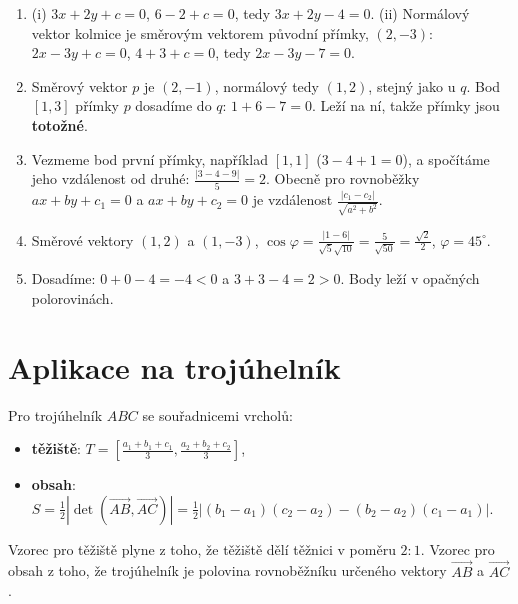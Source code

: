 \begin{solution}
  \begin{enumerate}[label=(\alph*)]
    \item (i) $3x + 2y + c = 0$, $6 - 2 + c = 0$, tedy $3x + 2y - 4 = 0$. (ii) Normálový vektor kolmice je směrovým vektorem původní přímky, $(2, -3)$: $2x - 3y + c = 0$, $4 + 3 + c = 0$, tedy $2x - 3y - 7 = 0$.
    \item Směrový vektor $p$ je $(2, -1)$, normálový tedy $(1, 2)$, stejný jako u $q$. Bod $[1, 3]$ přímky $p$ dosadíme do $q$: $1 + 6 - 7 = 0$. Leží na ní, takže přímky jsou \textbf{totožné}.
    \item Vezmeme bod první přímky, například $[1, 1]$ ($3 - 4 + 1 = 0$), a spočítáme jeho vzdálenost od druhé: $\frac{|3 - 4 - 9|}{5} = 2$. Obecně pro rovnoběžky $ax + by + c_1 = 0$ a $ax + by + c_2 = 0$ je vzdálenost $\frac{|c_1 - c_2|}{\sqrt{a^2 + b^2}}$.
    \item Směrové vektory $(1, 2)$ a $(1, -3)$, $\cos\varphi = \frac{|1 - 6|}{\sqrt{5}\sqrt{10}} = \frac{5}{\sqrt{50}} = \frac{\sqrt{2}}{2}$, $\varphi = 45^\circ$.
    \item Dosadíme: $0 + 0 - 4 = -4 < 0$ a $3 + 3 - 4 = 2 > 0$. Body leží v opačných polorovinách.
  \end{enumerate}
\end{solution}

\section{Aplikace na trojúhelník}\label{sec:aplikace-trojuhelnik}

\begin{definitionbox}
  Pro trojúhelník $ABC$ se souřadnicemi vrcholů:
  \begin{itemize}
    \item \textbf{těžiště}: $T = \left[\frac{a_1 + b_1 + c_1}{3}, \frac{a_2 + b_2 + c_2}{3}\right]$,
    \item \textbf{obsah}: $S = \frac{1}{2}\left|\det\left(\overrightarrow{AB}, \overrightarrow{AC}\right)\right| = \frac{1}{2}|(b_1 - a_1)(c_2 - a_2) - (b_2 - a_2)(c_1 - a_1)|$.
  \end{itemize}
\end{definitionbox}

Vzorec pro těžiště plyne z toho, že těžiště dělí těžnici v poměru $2:1$. Vzorec pro obsah z toho, že trojúhelník je polovina rovnoběžníku určeného vektory $\overrightarrow{AB}$ a $\overrightarrow{AC}$.

